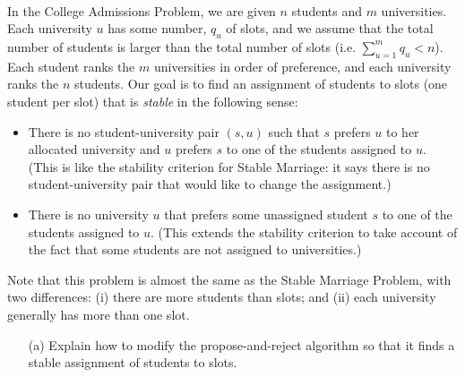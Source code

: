 \documentclass[11pt]{article}
\begin{document}
\begin{qunlist}
\begin{itemize}
\end{itemize}



\newpage

\\
In the College Admissions Problem, we are given $n$ students and $m$ universities. 
Each university $u$ has some number, $q_u$ of slots, 
and we assume that the total number of students is larger than the total number of slots
(i.e. $\sum_{u=1}^m{q_u} < n$). 
Each student ranks the $m$ universities in order of preference, and each university ranks the $n$ students. 
Our goal is to find an assignment of students to slots (one student per slot) that is \textit{stable} 
in the following sense:
\begin{itemize}
\item There is no student-university pair $(s,u)$ such that $s$ prefers $u$ to her allocated university 
and $u$ prefers $s$ to one of the students assigned to $u$. 
(This is like the stability criterion for Stable Marriage: 
it says there is no student-university pair that would like to change the assignment.)
\item There is no university $u$ that prefers some unassigned student $s$ to one of the students assigned to $u$.
(This extends the stability criterion to take account of the fact that 
some students are not assigned to universities.)
\end{itemize}

Note that this problem is almost the same as the Stable Marriage Problem, with two differences:
(i) there are more students than slots; and
(ii) each university generally has more than one slot.
\begin{itemize}
\item[(a)] Explain how to modify the propose-and-reject algorithm so that 
it finds a stable assignment of students to slots.


\end{itemize}
\end{qunlist}
\end{document}
